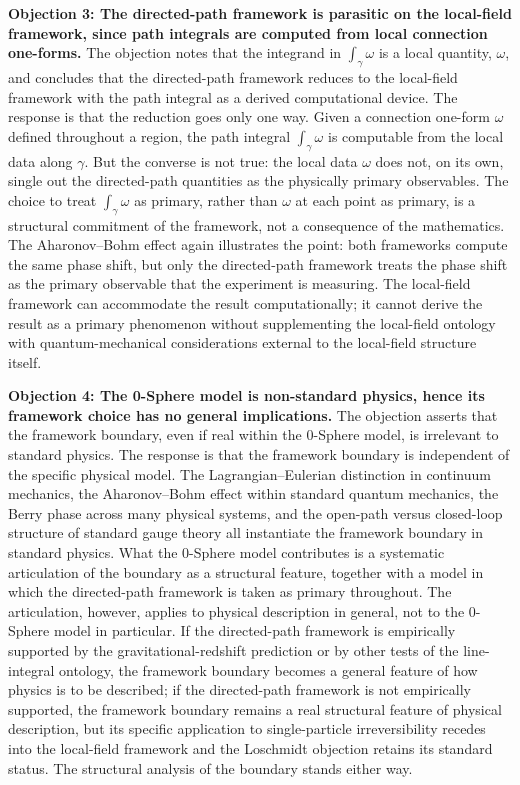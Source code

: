 \documentclass[%
 reprint, amsmath,amssymb, aps, prb, ]{revtex4-2}
\numberwithin{equation}{section}
\begin{document}
\textbf{Objection 3: The directed-path framework is parasitic on the local-field framework, since path integrals are computed from local connection one-forms.} The objection notes that the integrand in $\int_\gamma \omega$ is a local quantity, $\omega$, and concludes that the directed-path framework reduces to the local-field framework with the path integral as a derived computational device. The response is that the reduction goes only one way. Given a connection one-form $\omega$ defined throughout a region, the path integral $\int_\gamma \omega$ is computable from the local data along $\gamma$. But the converse is not true: the local data $\omega$ does not, on its own, single out the directed-path quantities as the physically primary observables. The choice to treat $\int_\gamma \omega$ as primary, rather than $\omega$ at each point as primary, is a structural commitment of the framework, not a consequence of the mathematics. The Aharonov--Bohm effect again illustrates the point: both frameworks compute the same phase shift, but only the directed-path framework treats the phase shift as the primary observable that the experiment is measuring. The local-field framework can accommodate the result computationally; it cannot derive the result as a primary phenomenon without supplementing the local-field ontology with quantum-mechanical considerations external to the local-field structure itself.

\textbf{Objection 4: The 0-Sphere model is non-standard physics, hence its framework choice has no general implications.} The objection asserts that the framework boundary, even if real within the 0-Sphere model, is irrelevant to standard physics. The response is that the framework boundary is independent of the specific physical model. The Lagrangian--Eulerian distinction in continuum mechanics, the Aharonov--Bohm effect within standard quantum mechanics, the Berry phase across many physical systems, and the open-path versus closed-loop structure of standard gauge theory all instantiate the framework boundary in standard physics. What the 0-Sphere model contributes is a systematic articulation of the boundary as a structural feature, together with a model in which the directed-path framework is taken as primary throughout. The articulation, however, applies to physical description in general, not to the 0-Sphere model in particular. If the directed-path framework is empirically supported by the gravitational-redshift prediction or by other tests of the line-integral ontology, the framework boundary becomes a general feature of how physics is to be described; if the directed-path framework is not empirically supported, the framework boundary remains a real structural feature of physical description, but its specific application to single-particle irreversibility recedes into the local-field framework and the Loschmidt objection retains its standard status. The structural analysis of the boundary stands either way.
\end{document}
